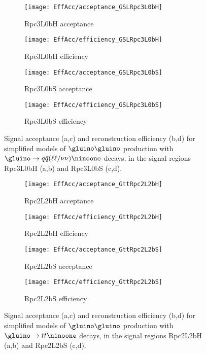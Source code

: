 \begin{figure}[htb!]
\centering
\begin{subfigure}[t]{0.49\textwidth}\texttt{[image: EffAcc/acceptance\_GSLRpc3L0bH]}\caption{Rpc3L0bH acceptance}\end{subfigure}
\begin{subfigure}[t]{0.49\textwidth}\texttt{[image: EffAcc/efficiency\_GSLRpc3L0bH]}\caption{Rpc3L0bH efficiency}\end{subfigure}
\begin{subfigure}[t]{0.49\textwidth}\texttt{[image: EffAcc/acceptance\_GSLRpc3L0bS]}\caption{Rpc3L0bS acceptance}\end{subfigure}
\begin{subfigure}[t]{0.49\textwidth}\texttt{[image: EffAcc/efficiency\_GSLRpc3L0bS]}\caption{Rpc3L0bS efficiency}\end{subfigure}
\caption{Signal acceptance (a,c) and reconstruction efficiency (b,d) 
for simplified models of $\gluino\gluino$ production with $\gluino\to q\bar q(\ell\ell/\nu\nu)\ninoone$ decays, 
in the signal regions Rpc3L0bH (a,b) and Rpc3L0bS (c,d).}
\end{figure}

\begin{figure}[htb!]
\centering
\begin{subfigure}[t]{0.49\textwidth}\texttt{[image: EffAcc/acceptance\_GttRpc2L2bH]}\caption{Rpc2L2bH acceptance}\end{subfigure}
\begin{subfigure}[t]{0.49\textwidth}\texttt{[image: EffAcc/efficiency\_GttRpc2L2bH]}\caption{Rpc2L2bH efficiency}\end{subfigure}
\begin{subfigure}[t]{0.49\textwidth}\texttt{[image: EffAcc/acceptance\_GttRpc2L2bS]}\caption{Rpc2L2bS acceptance}\end{subfigure}
\begin{subfigure}[t]{0.49\textwidth}\texttt{[image: EffAcc/efficiency\_GttRpc2L2bS]}\caption{Rpc2L2bS efficiency}\end{subfigure}
\caption{Signal acceptance (a,c) and reconstruction efficiency (b,d) 
for simplified models of $\gluino\gluino$ production with $\gluino\to t\bar t\ninoone$ decays, 
in the signal regions Rpc2L2bH (a,b) and Rpc2L2bS (c,d).}
\end{figure}

